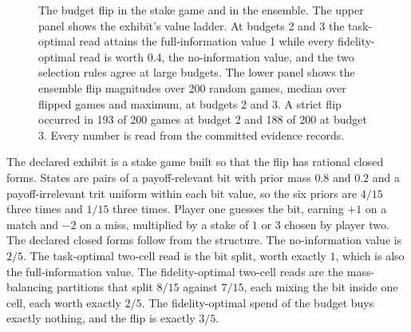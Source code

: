 \documentclass[aps,pre,reprint,nofootinbib]{revtex4-2}
\begin{document}
\begin{figure}[t]
\centering
{}
\caption{The budget flip in the stake game and in the ensemble.  The
upper panel shows the exhibit's value ladder.  At budgets 2 and 3
the task-optimal read attains the full-information value 1 while
every fidelity-optimal read is worth 0.4, the no-information value,
and the two selection rules agree at large budgets.  The lower panel
shows the ensemble flip magnitudes over 200 random games, median
over flipped games and maximum, at budgets 2 and 3.  A strict flip
occurred in 193 of 200 games at budget 2 and 188 of 200 at budget 3.
Every number is read from the committed evidence records.}
\label{fig:gd2}
\end{figure}

The declared exhibit is a stake game built so that the flip has
rational closed forms.  States are pairs of a payoff-relevant bit
with prior mass $0.8$ and $0.2$ and a payoff-irrelevant trit uniform
within each bit value, so the six priors are $4/15$ three times and
$1/15$ three times.  Player one guesses the bit, earning $+1$ on a
match and $-2$ on a miss, multiplied by a stake of $1$ or $3$ chosen
by player two.  The declared closed forms follow from the structure.
The no-information value is $2/5$.  The task-optimal two-cell read is
the bit split, worth exactly $1$, which is also the full-information
value.  The fidelity-optimal two-cell reads are the mass-balancing
partitions that split $8/15$ against $7/15$, each mixing the bit
inside one cell, each worth exactly $2/5$.  The fidelity-optimal
spend of the budget buys exactly nothing, and the flip is exactly
$3/5$.
\end{document}
